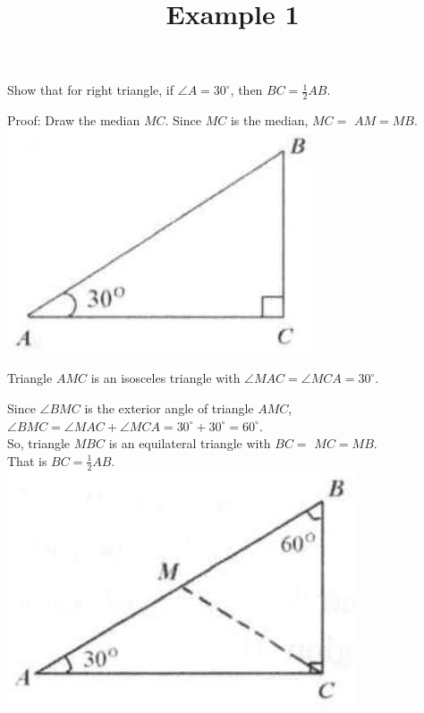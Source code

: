 \documentclass{article}
\title{Example 1}
\date{}
\begin{document}
\maketitle

Show that for right triangle, if \(\angle A=30^{\circ}\), then \(B C=\frac{1}{2} A B\).

Proof:
Draw the median \(M C\). Since \(M C\) is the median, \(M C=\) \(A M=M B\).\\
\centering
\includegraphics[width=\textwidth]{images/problem_image_1.jpg}

Triangle \(A M C\) is an isosceles triangle with \(\angle M A C=\angle M C A=30^{\circ}\).

Since \(\angle B M C\) is the exterior angle of triangle \(A M C\), \(\angle B M C=\angle M A C+\angle M C A=30^{\circ}+30^{\circ}=60^{\circ}\).\\
So, triangle \(M B C\) is an equilateral triangle with \(B C=\) \(M C=M B\).\\
That is \(B C=\frac{1}{2} A B\).\\
\centering
\includegraphics[width=\textwidth]{images/reasoning_image_1.jpg}
\end{document}
